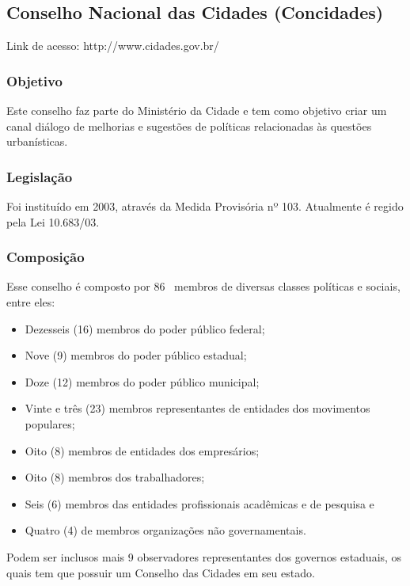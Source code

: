 \subsection*{Conselho Nacional das Cidades (Concidades)}

Link de acesso: http://www.cidades.gov.br/

\subsubsection*{Objetivo}

Este conselho faz parte do Ministério da Cidade e tem como objetivo
criar um canal diálogo de melhorias e sugestões de políticas
relacionadas às questões urbanísticas.

\subsubsection*{Legislação}

Foi instituído em 2003, através da Medida Provisória
nº 103. Atualmente é regido pela Lei 10.683/03.

\subsubsection*{Composição}

Esse conselho é composto por 86 ~membros de diversas classes
políticas e sociais, entre eles:

\begin{itemize}
\item 
Dezesseis (16) membros do poder público federal;
\item 
Nove (9) membros do poder público estadual;
\item 
Doze (12) membros do poder público municipal;
\item 
Vinte e três (23) membros representantes de entidades dos movimentos
populares;
\item 
Oito (8) membros de entidades dos empresários;
\item 
Oito (8) membros dos trabalhadores;
\item 
Seis (6) membros das entidades profissionais acadêmicas e de pesquisa
e
\item 
Quatro (4) de membros organizações não governamentais.
\end{itemize}

Podem ser inclusos mais 9 observadores representantes dos governos
estaduais, os quais tem que possuir um Conselho das Cidades em seu
estado.
\newpage
